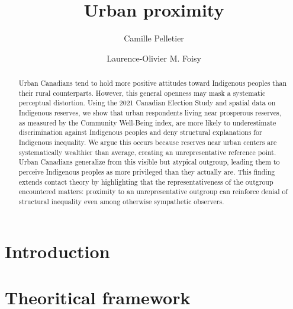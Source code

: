 \documentclass[12pt,letterpaper]{article}
\title{Urban proximity}
\author{Camille Pelletier \and Laurence-Olivier M. Foisy}
\date{}
\begin{document}
\maketitle

\begin{abstract}
\noindent
Urban Canadians tend to hold more positive attitudes toward Indigenous peoples than their rural counterparts. However, this general openness may mask a systematic perceptual distortion. Using the 2021 Canadian Election Study and spatial data on Indigenous reserves, we show that urban respondents living near prosperous reserves, as measured by the Community Well-Being index, are more likely to underestimate discrimination against Indigenous peoples and deny structural explanations for Indigenous inequality. We argue this occurs because reserves near urban centers are systematically wealthier than average, creating an unrepresentative reference point. Urban Canadians generalize from this visible but atypical outgroup, leading them to perceive Indigenous peoples as more privileged than they actually are. This finding extends contact theory by highlighting that the representativeness of the outgroup encountered matters: proximity to an unrepresentative outgroup can reinforce denial of structural inequality even among otherwise sympathetic observers.
\end{abstract}

\section{Introduction}

\section{Theoritical framework}
\end{document}
